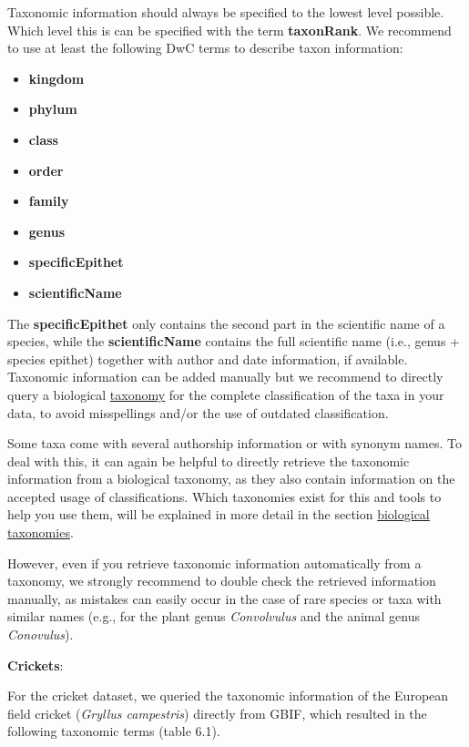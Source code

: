 \documentclass[
]{book}
\begin{document}
Taxonomic information should always be specified to the lowest level possible. Which level this is can be specified with the term \textbf{taxonRank}. We recommend to use at least the following DwC terms to describe taxon information:

\begin{itemize}
\item
  \textbf{kingdom}
\item
  \textbf{phylum}
\item
  \textbf{class}
\item
  \textbf{order}
\item
  \textbf{family}
\item
  \textbf{genus}
\item
  \textbf{specificEpithet}
\item
  \textbf{scientificName}
\end{itemize}

The \textbf{specificEpithet} only contains the second part in the scientific name of a species, while the \textbf{scientificName} contains the full scientific name (i.e., genus + species epithet) together with author and date information, if available. Taxonomic information can be added manually but we recommend to directly query a biological \protect\hyperlink{taxonomy}{taxonomy} for the complete classification of the taxa in your data, to avoid misspellings and/or the use of outdated classification.

Some taxa come with several authorship information or with synonym names. To deal with this, it can again be helpful to directly retrieve the taxonomic information from a biological taxonomy, as they also contain information on the accepted usage of classifications. Which taxonomies exist for this and tools to help you use them, will be explained in more detail in the section \protect\hyperlink{biological-taxonomies}{biological taxonomies}.

However, even if you retrieve taxonomic information automatically from a taxonomy, we strongly recommend to double check the retrieved information manually, as mistakes can easily occur in the case of rare species or taxa with similar names (e.g., for the plant genus \emph{Convolvulus} and the animal genus \emph{Conovulus}).

\textbf{Crickets}:

For the cricket dataset, we queried the taxonomic information of the European field cricket (\emph{Gryllus campestris}) directly from GBIF, which resulted in the following taxonomic terms (table 6.1).
\end{document}
